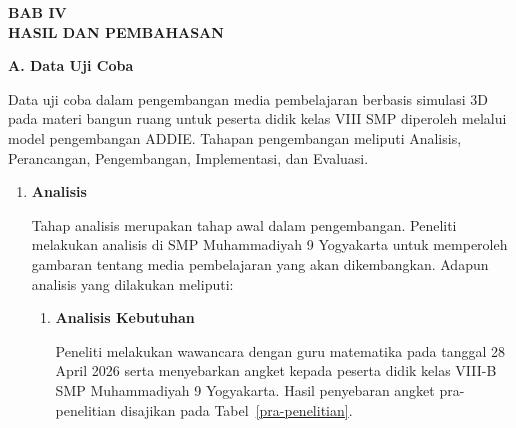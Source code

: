 \newpage
\begin{center}
    \textbf{BAB IV} \\
    \textbf{HASIL DAN PEMBAHASAN}
\end{center}

\textbf{A. Data Uji Coba}

\hspace*{1cm}Data uji coba dalam pengembangan media pembelajaran berbasis simulasi 3D pada materi bangun ruang untuk peserta didik kelas VIII SMP diperoleh melalui model pengembangan ADDIE. Tahapan pengembangan meliputi Analisis, Perancangan, Pengembangan, Implementasi, dan Evaluasi.

\begin{enumerate}[leftmargin=1cm, label=\arabic*.]
    \item \textbf{Analisis}
    
    \hspace*{1cm}Tahap analisis merupakan tahap awal dalam pengembangan. Peneliti melakukan analisis di SMP Muhammadiyah 9 Yogyakarta untuk memperoleh gambaran tentang media pembelajaran yang akan dikembangkan. Adapun analisis yang dilakukan meliputi:
    
    \begin{enumerate}[label=\textbf{\alph*.}]
        \item \textbf{Analisis Kebutuhan}
        
        \hspace*{1cm}Peneliti melakukan wawancara dengan guru matematika pada tanggal 28 April 2026 serta menyebarkan angket kepada peserta didik kelas VIII-B SMP Muhammadiyah 9 Yogyakarta. Hasil penyebaran angket pra-penelitian disajikan pada Tabel~\ref{pra-penelitian}.
        

\end{enumerate}
\end{enumerate}
